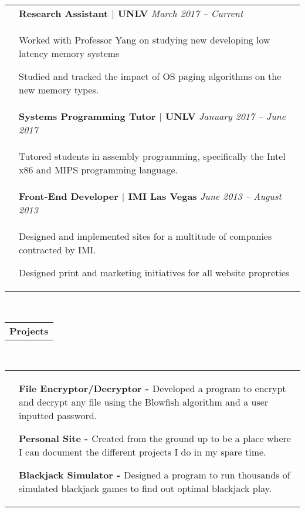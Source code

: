 \documentclass[a4paper,12pt]{extarticle}
\begin{document}
\begin{tabular}[b]{p{1.3cm} p{14.4cm}}
	& {\bf{Research Assistant $|$ UNLV}} \hfill \emph{\footnotesize{March 2017 -- Current}}
    \\ & \small{ \begin{compactitem}
    	\item Worked with Professor Yang on studying new developing low latency\hyphenation{memory} memory systems
    	\item Studied and tracked the impact of OS paging algorithms on the new memory types.
	\end{compactitem}} \smallskip \\
    & {\bf{Systems Programming Tutor $|$ UNLV}} \hfill \emph{\footnotesize{January 2017 -- June 2017}}
    \\ & \small{ \begin{compactitem}
    	\item Tutored students in assembly programming, specifically the Intel x86 and MIPS programming language.
	\end{compactitem}} \smallskip \\
    & {\bf{Front-End Developer $|$ IMI Las Vegas}} \hfill \emph{\footnotesize{June 2013 -- August 2013}}
    \\ & \small{\begin{compactitem}
    	\item Designed and implemented sites for a multitude of companies contracted by IMI.
        \item Designed print and marketing initiatives for all website propreties
	\end{compactitem}}
\end{tabular} \\
\raggedright{\begin{tabular}[b]{p{5.5cm}}
	\bf{\Large{Projects}} \\
    \cline{1-1}
\end{tabular}} \\
	\begin{tabular}[b]{p{.6cm} p{14.4cm}}
	&
    \begin{compactitem}
    	\item \small{\bf{File Encryptor/Decryptor - }}Developed a program to encrypt and decrypt any file using the Blowfish algorithm and a user inputted password.
	\end{compactitem} \medskip
    \begin{compactitem}
        \item \small{\bf{Personal Site - }}Created from the ground up to be a place where I can document the different projects I do in my spare time.
	\end{compactitem} \medskip
    \begin{compactitem}
        \item \small{\bf{Blackjack Simulator - }}Designed a program to run thousands of simulated blackjack games to find out optimal blackjack play.
	\end{compactitem}
\end{tabular}
\end{document}
